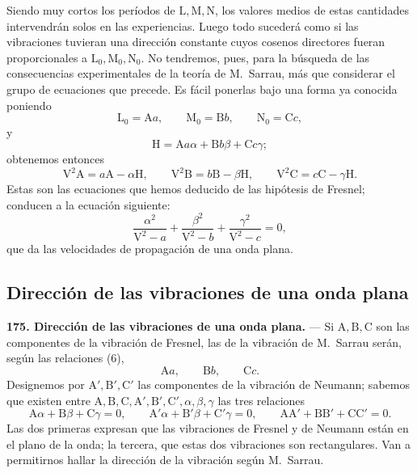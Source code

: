 Siendo muy cortos los períodos de $\mathrm L,\mathrm M,\mathrm N$, los
valores medios de estas cantidades intervendrán solos en las experiencias.
Luego todo sucederá como si las vibraciones tuvieran una dirección
constante cuyos cosenos directores fueran proporcionales a $\mathrm
L_0,\mathrm M_0,\mathrm N_0$. No tendremos, pues, para la búsqueda de las
consecuencias experimentales de la teoría de M.~Sarrau, más que
considerar el grupo de ecuaciones que precede. Es fácil ponerlas bajo una
forma ya conocida poniendo
\begin{equation}
\mathrm L_0=\mathrm Aa,\qquad \mathrm M_0=\mathrm Bb,\qquad \mathrm N_0=\mathrm Cc,
\tag{6}
\end{equation}
y
\[
\mathrm H=\mathrm Aa\alpha+\mathrm Bb\beta+\mathrm Cc\gamma;
\]
obtenemos entonces
\begin{equation}
\mathrm V^2\mathrm A=a\mathrm A-\alpha \mathrm H,\qquad
\mathrm V^2\mathrm B=b\mathrm B-\beta \mathrm H,\qquad
\mathrm V^2\mathrm C=c\mathrm C-\gamma \mathrm H.
\tag{VI}
\end{equation}
Estas son las ecuaciones que hemos deducido de las hipótesis de Fresnel;
conducen a la ecuación siguiente:
\[
\frac{\alpha^2}{\mathrm V^2-a}+\frac{\beta^2}{\mathrm V^2-b}+\frac{\gamma^2}{\mathrm V^2-c}=0,
\]
que da las velocidades de propagación de una onda plana.

\subsection{Dirección de las vibraciones de una onda plana}

\noindent\textbf{175. Dirección de las vibraciones de una onda plana.} —
Si $\mathrm A,\mathrm B,\mathrm C$ son las componentes de la vibración de
Fresnel, las de la vibración de M.~Sarrau serán, según las relaciones (6),
\[
\mathrm Aa,\qquad \mathrm Bb,\qquad \mathrm Cc.
\]
Designemos por $\mathrm A',\mathrm B',\mathrm C'$ las componentes de la
vibración de Neumann; sabemos que existen entre $\mathrm A,\mathrm
B,\mathrm C,\mathrm A',\mathrm B',\mathrm C',\alpha,\beta,\gamma$ las tres
relaciones
\[
\mathrm A\alpha+\mathrm B\beta+\mathrm C\gamma=0,\qquad
\mathrm A'\alpha+\mathrm B'\beta+\mathrm C'\gamma=0,\qquad
\mathrm{AA}'+\mathrm{BB}'+\mathrm{CC}'=0.
\]
Las dos primeras expresan que las vibraciones de Fresnel y de Neumann
están en el plano de la onda; la tercera, que estas dos vibraciones son
rectangulares. Van a permitirnos hallar la dirección de la vibración
según M.~Sarrau.

